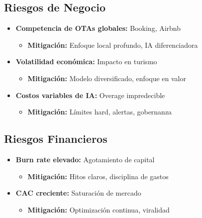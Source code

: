 \documentclass[12pt]{article}
\begin{document}
\subsection{Riesgos de Negocio}

\begin{itemize}
    \item \textbf{Competencia de OTAs globales:} Booking, Airbnb
    \begin{itemize}
        \item \textbf{Mitigación:} Enfoque local profundo, IA diferenciadora
    \end{itemize}
    
    \item \textbf{Volatilidad económica:} Impacto en turismo
    \begin{itemize}
        \item \textbf{Mitigación:} Modelo diversificado, enfoque en valor
    \end{itemize}
    
    \item \textbf{Costos variables de IA:} Overage impredecible
    \begin{itemize}
        \item \textbf{Mitigación:} Límites hard, alertas, gobernanza
    \end{itemize}
\end{itemize}

\subsection{Riesgos Financieros}

\begin{itemize}
    \item \textbf{Burn rate elevado:} Agotamiento de capital
    \begin{itemize}
        \item \textbf{Mitigación:} Hitos claros, disciplina de gastos
    \end{itemize}
    
    \item \textbf{CAC creciente:} Saturación de mercado
    \begin{itemize}
        \item \textbf{Mitigación:} Optimización continua, viralidad
    \end{itemize}
\end{itemize}

\end{document}
